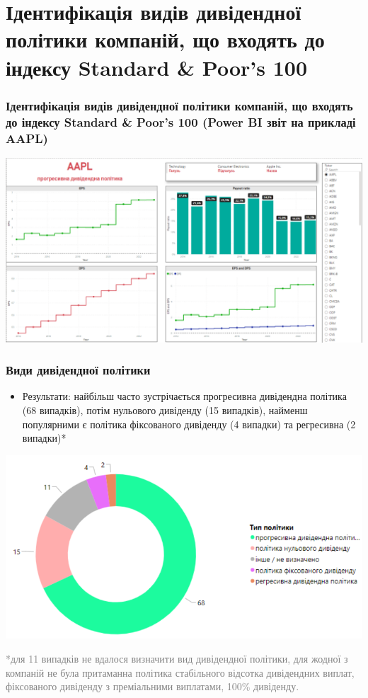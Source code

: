 \documentclass[aspectratio=169]{beamer}
\begin{document}
\section{Ідентифікація видів дивідендної політики компаній, що входять до індексу Standard \& Poor's 100}
\begin{frame}
\frametitle{Ідентифікація видів дивідендної політики компаній, що входять до індексу Standard \& Poor's 100 (Power BI звіт на прикладі AAPL)}
\begin{center}
\includegraphics[scale=0.30]{AAPL example.png}
\end{center}
\end{frame}

\begin{frame}
\frametitle{Види дивідендної політики}
\begin{center}
\begin{itemize}
\item  \alert {Результати:} найбільш часто зустрічається прогресивна дивідендна політика (68 випадків), потім нульового дивіденду (15 випадків), найменш популярними є політика фіксованого дивіденду (4 випадки) та регресивна (2 випадки)*
\end{itemize}
\tinyskip
\includegraphics[scale=0.40]{Dividend policy Types.png}
\tinyskip
\end{center}
\scriptsize \textcolor{gray}{*для 11 випадків не вдалося визначити вид дивідендної політики, для жодної з компаній не була притаманна політика стабільного відсотка дивідендних виплат, фіксованого дивіденду з преміальними виплатами, 100\% дивіденду.} 
\end{frame}
\end{document}

